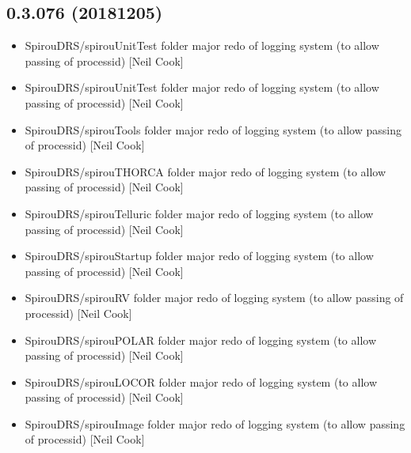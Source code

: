 \documentclass[a4paper,10pt,english]{report}
\begin{document}
\subsection{0.3.076 (2018\sphinxhyphen{}12\sphinxhyphen{}05)}
\label{\detokenize{misc/changelog:id265}}\begin{itemize}
\item {} 
SpirouDRS/spirouUnitTest folder \sphinxhyphen{} major redo of logging system (to
allow passing of process\sphinxhyphen{}id) {[}Neil Cook{]}

\item {} 
SpirouDRS/spirouUnitTest folder \sphinxhyphen{} major redo of logging system (to
allow passing of process\sphinxhyphen{}id) {[}Neil Cook{]}

\item {} 
SpirouDRS/spirouTools folder \sphinxhyphen{} major redo of logging system (to allow
passing of process\sphinxhyphen{}id) {[}Neil Cook{]}

\item {} 
SpirouDRS/spirouTHORCA folder \sphinxhyphen{} major redo of logging system (to allow
passing of process\sphinxhyphen{}id) {[}Neil Cook{]}

\item {} 
SpirouDRS/spirouTelluric folder \sphinxhyphen{} major redo of logging system (to
allow passing of process\sphinxhyphen{}id) {[}Neil Cook{]}

\item {} 
SpirouDRS/spirouStartup folder \sphinxhyphen{} major redo of logging system (to
allow passing of process\sphinxhyphen{}id) {[}Neil Cook{]}

\item {} 
SpirouDRS/spirouRV folder \sphinxhyphen{} major redo of logging system (to allow
passing of process\sphinxhyphen{}id) {[}Neil Cook{]}

\item {} 
SpirouDRS/spirouPOLAR folder \sphinxhyphen{} major redo of logging system (to allow
passing of process\sphinxhyphen{}id) {[}Neil Cook{]}

\item {} 
SpirouDRS/spirouLOCOR folder \sphinxhyphen{} major redo of logging system (to allow
passing of process\sphinxhyphen{}id) {[}Neil Cook{]}

\item {} 
SpirouDRS/spirouImage folder \sphinxhyphen{} major redo of logging system (to allow
passing of process\sphinxhyphen{}id) {[}Neil Cook{]}


\end{itemize}
\end{document}
